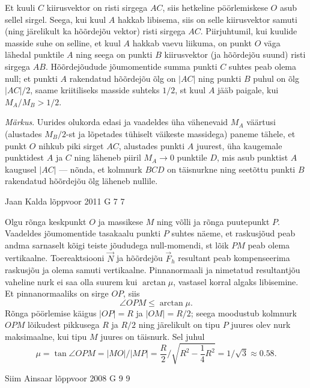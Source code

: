 \documentclass[11pt, twoside]{article}
\begin{document}
{{\ifSolution
Et kuuli $C$ kiirusvektor on risti sirgega $AC$, siis hetkeline pöörlemiskese $O$ asub sellel sirgel. Seega, kui kuul $A$ hakkab libisema, siis on selle kiirusvektor samuti (ning järelikult ka hõõrdejõu vektor) risti sirgega $AC$. Piirjuhtumil, kui kuulide masside suhe on selline, et kuul $A$ hakkab vaevu liikuma, on punkt $O$ väga lähedal punktile $A$ ning seega on punkti $B$ kiirusvektor (ja hõõrdejõu suund) risti sirgega $AB$. Hõõrdejõudude jõumomentide summa punkti $C$ suhtes peab olema null; et punkti $A$ rakendatud hõõrdejõu õlg on $|AC|$ ning punkti $B$ puhul on õlg $|AC|/2$, saame kriitiliseks masside suhteks $1/2$, st kuul $A$ jääb paigale, kui $M_A/M_B > 1/2$.

\emph{Märkus}. Uurides olukorda edasi ja vaadeldes üha vähenevaid $M_A$ väärtusi (alustades $M_B/2$-st ja lõpetades tühiselt väikeste massidega) paneme tähele, et punkt $O$ nihkub piki sirget $AC$, alustades punkti $A$ juurest, üha kaugemale punktidest $A$ ja $C$ ning läheneb piiril $M_A \rightarrow 0$ punktile $D$, mis asub punktist $A$ kaugusel $|AC|$ --- nõnda, et kolmnurk $BCD$ on täisnurkne ning seetõttu punkti $B$ rakendatud hõõrdejõu õlg läheneb nullile.
\fi
}

{Jaan Kalda} %
{lõppvoor} %
{2011} %
{G 7} %
{7} %
{

\ifSolution
Olgu rõnga keskpunkt $O$ ja massikese $M$ ning võlli ja rõnga puutepunkt $P$. Vaadeldes jõumomentide tasakaalu punkti $P$ suhtes näeme, et raskusjõud peab andma
sarnaselt kõigi teiste jõududega null-momendi, st lõik $PM$ peab olema vertikaalne.
Toereaktsiooni $\vec N$ ja hõõrdejõu $\vec F_h$ resultant peab kompenseerima raskusjõu ja olema samuti vertikaalne. Pinnanormaali ja nimetatud resultantjõu vaheline nurk ei
saa olla suurem kui $\arctan\mu$, vastasel korral algaks libisemine. Et pinnanormaaliks on sirge $OP$, siis
\[
\angle O P M \leq \arctan \mu.
\]
Rõnga pöörlemise käigus $|OP| = R$ ja $|OM| = R/2$; seega moodustub kolmnurk
$OPM$ lõikudest pikkusega $R$ ja $R/2$ ning järelikult on tipu $P$ juures olev nurk
maksimaalne, kui tipu $M$ juures on täisnurk. Sel juhul
\[
\mu=\tan \angle O P M=|M O| /|M P|=\frac{R}{2} / \sqrt{R^{2}-\frac{1}{4} R^{2}}=1 / \sqrt{3} \approx \num{0,58}.
\]
\fi
}

{Siim Ainsaar} %
{lõppvoor} %
{2008} %
{G 9} %
{9} %
{

}}
\end{document}

